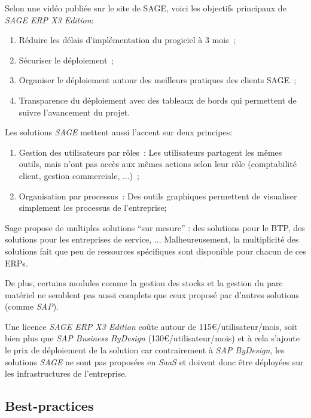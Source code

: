             Selon une vidéo publiée sur le site de SAGE, voici les objectifs principaux de \textit{SAGE ERP X3 Edition}:

            \begin{enumerate}
                \item Réduire les délais d'implémentation du progiciel à 3 mois~;
                \item Sécuriser le déploiement~;
                \item Organiser le déploiement autour des meilleurs pratiques des clients SAGE~;
                \item Transparence du déploiement avec des tableaux de bords qui permettent de suivre l'avancement du projet.
            \end{enumerate}

            Les solutions \textit{SAGE} mettent aussi l'accent sur deux principes:

            \begin{enumerate}
                \item Gestion des utilisateurs par rôles~: Les utilisateurs partagent les mêmes outils, mais n'ont pas accès aux mêmes actions selon leur rôle (comptabilité client, gestion commerciale, ...)~;
                \item Organisation par processus~: Des outils graphiques permettent de visualiser simplement les processus de l'entreprise;
            \end{enumerate}

            Sage propose de multiples solutions ``sur mesure'' : des solutions pour le BTP, des solutions pour les entreprises de service, ... Malheureusement, la multiplicité des solutions fait que peu de ressources spécifiques sont disponible pour chacun de ces ERPs.

            De plus, certains modules comme la gestion des stocks et la gestion du parc matériel ne semblent pas aussi complets que ceux proposé par d'autres solutions (comme \textit{SAP}).

            Une licence \textit{SAGE ERP X3 Edition} coûte autour de 115€/utilisateur/mois, soit bien plus que \textit{SAP Business ByDesign} (130€/utilisateur/mois) et à cela s'ajoute le prix de déploiement de la solution car contrairement à \textit{SAP ByDesign}, les solutions \textit{SAGE} ne sont pas proposées en \textit{SaaS} et doivent donc être déployées sur les infrastructures de l'entreprise.


    \subsection{Best-practices}

